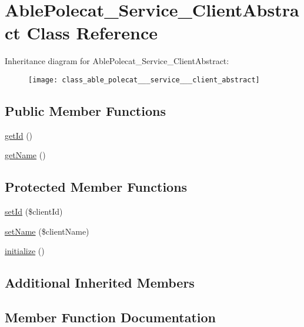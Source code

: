 \hypertarget{class_able_polecat___service___client_abstract}{}\section{Able\+Polecat\+\_\+\+Service\+\_\+\+Client\+Abstract Class Reference}
\label{class_able_polecat___service___client_abstract}
Inheritance diagram for Able\+Polecat\+\_\+\+Service\+\_\+\+Client\+Abstract\+:\begin{figure}[H]
\begin{center}
\leavevmode
\texttt{[image: class\_able\_polecat\_\_\_service\_\_\_client\_abstract]}
\end{center}
\end{figure}
\subsection*{Public Member Functions}
\begin{DoxyCompactItemize}
\item 
\hyperlink{class_able_polecat___service___client_abstract_a12251d0c022e9e21c137a105ff683f13}{get\+Id} ()
\item 
\hyperlink{class_able_polecat___service___client_abstract_a3d0963e68bb313b163a73f2803c64600}{get\+Name} ()
\end{DoxyCompactItemize}
\subsection*{Protected Member Functions}
\begin{DoxyCompactItemize}
\item 
\hyperlink{class_able_polecat___service___client_abstract_a89488c902e46a733882cc81d473bbfcb}{set\+Id} (\$client\+Id)
\item 
\hyperlink{class_able_polecat___service___client_abstract_abd06afd27b593ff9afefc8c5ac81a4c9}{set\+Name} (\$client\+Name)
\item 
\hyperlink{class_able_polecat___service___client_abstract_a91098fa7d1917ce4833f284bbef12627}{initialize} ()
\end{DoxyCompactItemize}
\subsection*{Additional Inherited Members}


\subsection{Member Function Documentation}
\hypertarget{class_able_polecat___service___client_abstract_a12251d0c022e9e21c137a105ff683f13}{}
